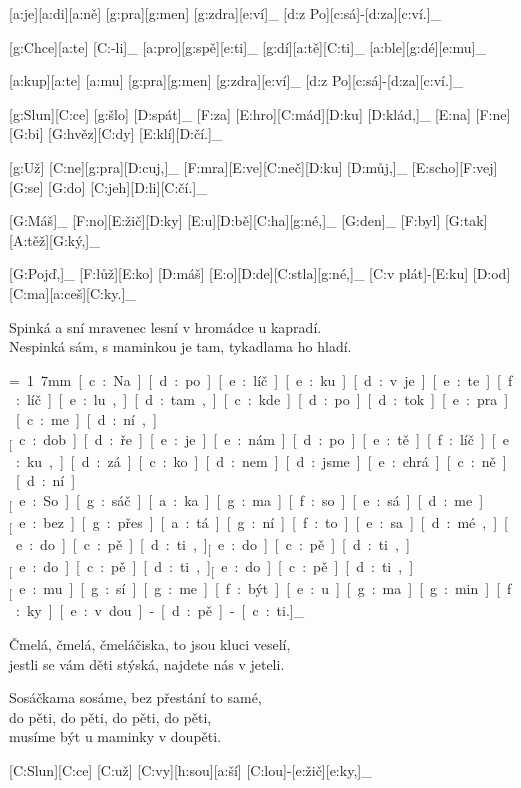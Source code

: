 [a:je][a:di][a:ně] [g:pra][g:men] [g:zdra][e:ví]_
[d:z Po][c:sá]-[d:za][c:ví.]_

[g:Chce][a:te] [C:-li]_ [a:pro][g:spě][e:ti]_
[g:dí][a:tě][C:ti]_ [a:ble][g:dé][e:mu]_

[a:kup][a:te] [a:mu] [g:pra][g:men] [g:zdra][e:ví]_
[d:z Po][c:sá]-[d:za][c:ví.]_



[g:Slun][C:ce] [g:šlo] [D:spát]_ [F:za] [E:hro][C:mád][D:ku] [D:klád,]_
[E:na] [F:ne][G:bi] [G:hvěz][C:dy] [E:klí][D:čí.]_

[g:Už] [C:ne][g:pra][D:cuj,]_ [F:mra][E:ve][C:neč][D:ku] [D:můj,]_
[E:scho][F:vej] [G:se] [G:do] [C:jeh][D:li][C:čí.]_

[G:Máš]_ [F:no][E:žič][D:ky] [E:u][D:bě][C:ha][g:né,]_
[G:den]_ [F:byl] [G:tak] [A:těž][G:ký,]_

[G:Pojď,]_ [F:lůž][E:ko] [D:máš] [E:o][D:de][C:stla][g:né,]_
[C:v plát]-[E:ku] [D:od] [C:ma][a:ceš][C:ky.]_

Spinká a sní mravenec lesní
v hromádce u kapradí. \\
Nespinká sám, s maminkou je tam,
tykadlama ho hladí.



{\unit=1.7mm
[c:Na] [d:po][e:líč][e:ku] [d:v je][e:te][f:líč][e:lu,] %
[d:tam,] [c:kde] [d:po][d:tok] [e:pra][c:me][d:ní,]_

[c:dob][d:ře] [e:je] [e:nám] [d:po] [e:tě][f:líč][e:ku,] %
[d:zá][c:ko][d:nem] [d:jsme] [e:chrá][c:ně][d:ní.]_

[e:So][g:sáč][a:ka][g:ma] [f:so][e:sá][d:me]_
[e:bez] [g:přes][a:tá][g:ní] [f:to] [e:sa][d:mé,]_

\unit
[e:do] [c:pě][d:ti,]_
[e:do] [c:pě][d:ti,]_
[e:do] [c:pě][d:ti,]_
[e:do] [c:pě][d:ti,]_

[e:mu][g:sí][g:me] [f:být] [e:u] [g:ma][g:min][f:ky] %
[e:v dou]-[d:pě]-[c:ti.]_
}

Čmelá, čmelá, čmeláčiska,
to jsou kluci veselí,\\
jestli se vám děti stýská,
najdete nás v jeteli.

Sosáčkama sosáme,
bez přestání to samé,\\
do pěti, do pěti,
do pěti, do pěti,\\
musíme být u maminky v doupěti.



[C:Slun][C:ce] [C:už] [C:vy][h:sou][a:ší] [C:lou]-[e:žič][e:ky,]_

